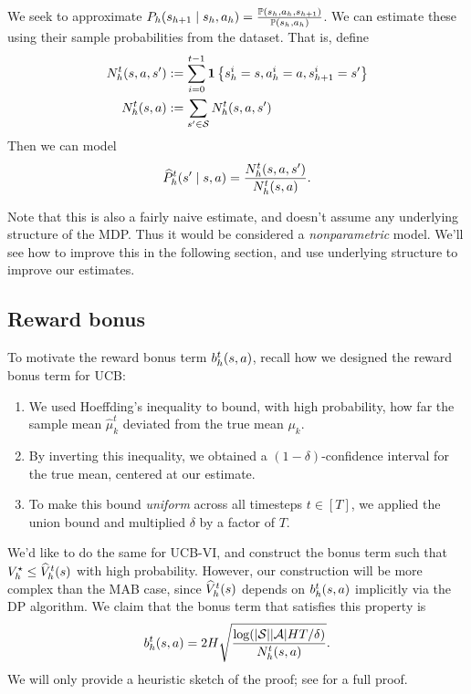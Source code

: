 \documentclass[\main/main]{subfiles}
\begin{document}
We seek to approximate $P_h(s_{h+1} \mid s_h, a_h) = \frac{\operatorname{\mathbb{P}}(s_h, a_h, s_{h+1})}{\operatorname{\mathbb{P}}(s_h, a_h)}$. We can estimate these using their sample probabilities from the dataset. That is, define
\begin{align*}
    N_h^t(s, a, s') &:= \sum_{i=0}^{t-1} \mathbf{1}\left\{ s_h^i = s, a_h^i = a, s_{h+1}^i = s' \right\} \\
    N_h^t(s, a) &:= \sum_{s' \in \mathcal{S}} N_h^t(s, a, s') \\
\end{align*}
Then we can model
\[
    \widehat{P}_h^t(s' \mid s, a) = \frac{N_h^t(s, a, s')}{N_h^t(s, a)}.
\]
\begin{remark}
Note that this is also a fairly naive estimate, and doesn't assume any underlying structure of the MDP. Thus it would be considered a \emph{nonparametric} model. We'll see how to improve this in the following section, and use underlying structure to improve our estimates.
\end{remark}

\subsection{Reward bonus}

To motivate the reward bonus term $b_h^t(s, a)$, recall how we designed the reward bonus term for UCB:
\begin{enumerate}
    \item  We used Hoeffding's inequality to bound, with high probability, how far the sample mean $\hat \mu_k^t$ deviated from the true mean $\mu_k$.
    \item By inverting this inequality, we obtained a $(1-\delta)$-confidence interval for the true mean,
    centered at our estimate.
    \item To make this bound \emph{uniform} across all timesteps $t \in [T]$,
    we applied the union bound and multiplied $\delta$ by a factor of $T$.
\end{enumerate}

We'd like to do the same for UCB-VI, and construct the bonus term such that $V_h^\star \le \widehat{V}_h^t(s)$ with high probability.
However, our construction will be more complex than the MAB case, since $\widehat{V}_h^t(s)$ depends on $b_h^t(s, a)$ implicitly via the DP algorithm.
We claim that the bonus term that satisfies this property is
\[
    b_h^t(s, a) = 2 H \sqrt{\frac{\log( |\mathcal{S}||\mathcal{A}|H T/\delta )}{N_h^t(s, a)}}.
\]
We will only provide a heuristic sketch of the proof; see \cite[Section 7.3]{agarwal_reinforcement_2022} for a full proof.
\end{document}
